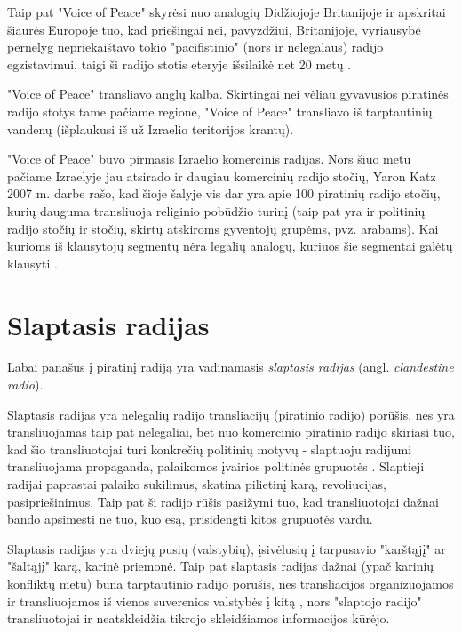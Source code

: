\documentclass[kursinis-darbas]{vukf}
\begin{document}
Taip pat "Voice of Peace" skyrėsi nuo analogių Didžiojoje Britanijoje ir apskritai šiaurės Europoje tuo, kad priešingai nei, pavyzdžiui, Britanijoje, vyriausybė pernelyg nepriekaištavo tokio "pacifistinio" (nors ir nelegalaus) radijo egzistavimui, taigi ši radijo stotis eteryje išsilaikė net 20 metų \cite[p.~159]{os_the_noble_pirate_the_voice_of_peace_offshore_radio_station}.

"Voice of Peace" transliavo anglų kalba. Skirtingai nei vėliau gyvavusios piratinės radijo stotys tame pačiame regione, "Voice of Peace" transliavo iš tarptautinių vandenų (išplaukusi iš už Izraelio teritorijos krantų).

"Voice of Peace" buvo pirmasis Izraelio komercinis radijas. Nors šiuo metu pačiame Izraelyje jau atsirado ir daugiau komercinių radijo stočių, Yaron Katz 2007 m. darbe rašo, kad šioje šalyje vis dar yra apie 100 piratinių radijo stočių, kurių dauguma transliuoja religinio pobūdžio turinį (taip pat yra ir politinių radijo stočių ir stočių, skirtų atskiroms gyventojų grupėms, pvz. arabams). Kai kurioms iš klausytojų segmentų nėra legalių analogų, kuriuos šie segmentai galėtų klausyti \cite[p.389]{yk_the_other_media_alternative_communications_in_israel}.


\section{Slaptasis radijas}

Labai panašus į piratinį radiją yra vadinamasis \emph{slaptasis radijas} (angl. \emph{clandestine radio}).

Slaptasis radijas yra nelegalių radijo transliacijų (piratinio radijo) porūšis, nes yra transliuojamas taip pat nelegaliai, bet nuo komercinio piratinio radijo skiriasi tuo, kad šio transliuotojai turi konkrečių politinių motyvų - slaptuoju radijumi transliuojama propaganda, palaikomos įvairios politinės grupuotės \cite[p.~334]{chs_encyclopedia_of_radio}. Slaptieji radijai paprastai palaiko sukilimus, skatina pilietinį karą, revoliucijas, pasipriešinimus. Taip pat ši radijo rūšis pasižymi tuo, kad transliuotojai dažnai bando apsimesti ne tuo, kuo esą, prisidengti kitos grupuotės vardu.

Slaptasis radijas yra dviejų pusių (valstybių), įsivėlusių į tarpusavio "karštąjį" ar "šaltąjį" karą, karinė priemonė. Taip pat slaptasis radijas dažnai (ypač karinių konfliktų metu) būna tarptautinio radijo porūšis, nes transliacijos organizuojamos ir transliuojamos iš vienos suverenios valstybės į kitą \cite[p.~749]{chs_encyclopedia_of_radio}, nors "slaptojo radijo" transliuotojai ir neatskleidžia tikrojo skleidžiamos informacijos kūrėjo.
\end{document}
